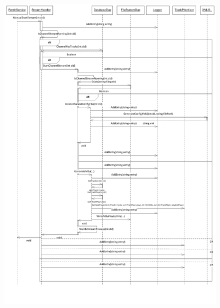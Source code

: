 \documentclass[a4paper,11pt,report]{article}
\begin{document}
{\begin{figure}[htp]
\centering
\includegraphics[width=17cm,keepaspectratio=true,trim=0pt 300pt 0pt 0pt]{./StartStreamSD.pdf}
\end{figure}

}
\end{document}
